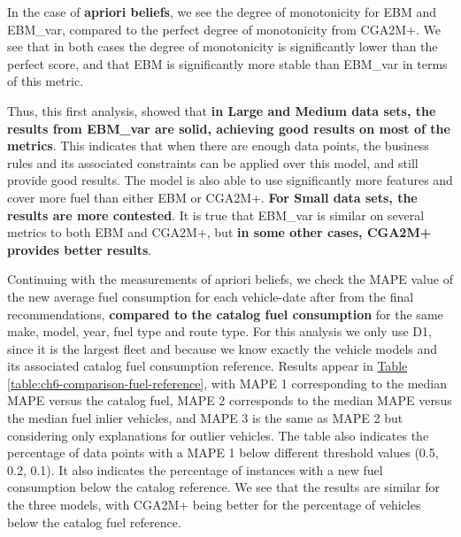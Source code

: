 In the case of \textbf{apriori beliefs}, we see the degree of monotonicity for EBM and EBM\_var, compared to the perfect degree of monotonicity from CGA2M+. We see that in both cases the degree of monotonicity is significantly lower than the perfect score, and that EBM is significantly more stable than EBM\_var in terms of this metric.

Thus, this first analysis, showed that \textbf{in Large and Medium data sets, the results from EBM\_var are solid, achieving good results on most of the metrics}. This indicates that when there are enough data points, the business rules and its associated constraints can be applied over this model, and still provide good results. The model is also able to use significantly more features and cover more fuel than either EBM or CGA2M+. \textbf{For Small data sets, the results are more contested}. It is true that EBM\_var is similar on several metrics to both EBM and CGA2M+, but \textbf{in some other cases, CGA2M+ provides better results}.

Continuing with the measurements of apriori beliefs, we check the MAPE value of the new average fuel consumption for each vehicle-date after from the final recommendations, \textbf{compared to the catalog fuel consumption} for the same make, model, year, fuel type and route type. For this analysis we only use D1, since it is the largest fleet and because we know exactly the vehicle models and its associated catalog fuel consumption reference. Results appear in \hyperref[table:ch6-comparison-fuel-reference]{Table} \ref{table:ch6-comparison-fuel-reference}, with MAPE 1 corresponding to the median MAPE versus the catalog fuel, MAPE 2 corresponds to the median MAPE versus the median fuel inlier vehicles, and MAPE 3 is the same as MAPE 2 but considering only explanations for outlier vehicles. The table also indicates the percentage of data points with a MAPE 1 below different threshold values (0.5, 0.2, 0.1). It also indicates the percentage of instances with a new fuel consumption below the catalog reference. We see that the results are similar for the three models, with CGA2M+ being better for the percentage of vehicles below the catalog fuel reference. 

